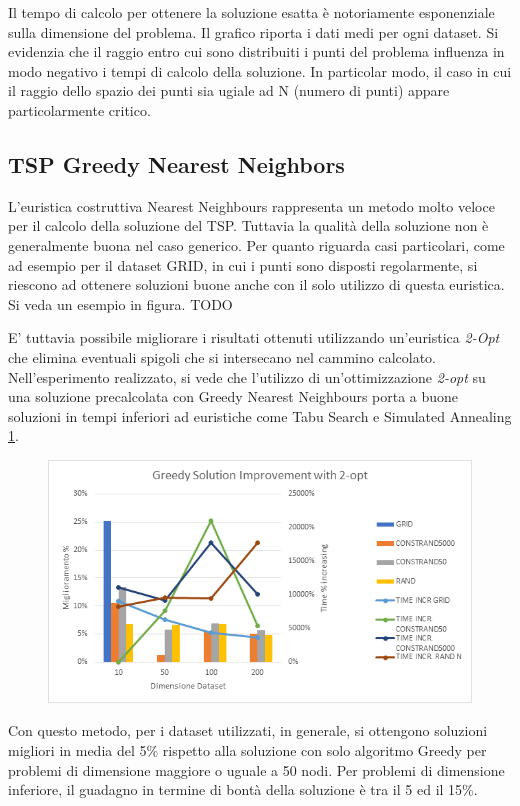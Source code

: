 	Il tempo di calcolo per ottenere la soluzione esatta è notoriamente esponenziale sulla dimensione del problema. Il grafico riporta i dati medi per ogni dataset. Si evidenzia che il raggio entro cui sono distribuiti i punti del problema influenza in modo negativo i tempi di calcolo della soluzione. In particolar modo, il caso in cui il raggio dello spazio dei punti sia ugiale ad N (numero di punti) appare particolarmente critico.
	
	\subsection{TSP Greedy Nearest Neighbors}
	L’euristica costruttiva Nearest Neighbours  rappresenta un metodo molto veloce per il calcolo della soluzione del TSP. Tuttavia la qualità della soluzione non è generalmente buona nel caso generico. Per quanto riguarda casi particolari, come ad esempio per il dataset GRID, in cui i punti sono disposti regolarmente, si riescono ad ottenere soluzioni buone anche con il solo utilizzo di questa euristica. Si veda un esempio in figura. TODO 
	
	E' tuttavia possibile migliorare i risultati ottenuti utilizzando un'euristica \textit{2-Opt} che elimina eventuali spigoli che si intersecano nel cammino calcolato. 
	Nell'esperimento realizzato, si vede che l'utilizzo di un'ottimizzazione \textit{2-opt} su una soluzione  precalcolata con Greedy Nearest Neighbours porta a buone soluzioni in tempi inferiori ad euristiche come Tabu Search e Simulated Annealing \ref{fig:greedyoptimprove}. 

	\begin{figure}[h!]
		\centering
		\includegraphics[width=0.7\linewidth]{img/GreedyOptImprove}
		\caption{}
		\label{fig:greedyoptimprove}
	\end{figure}
     
     Con questo metodo, per i dataset utilizzati, in generale, si ottengono soluzioni migliori in media del 5\% rispetto alla soluzione con solo algoritmo Greedy per problemi di dimensione maggiore o uguale a 50 nodi. Per problemi di dimensione inferiore, il guadagno in termine di bontà della soluzione è tra il 5 ed il 15\%. 
     
